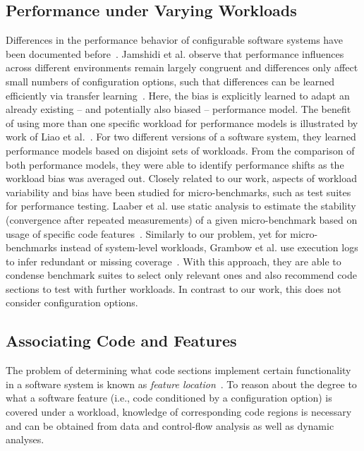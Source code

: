 \subsection{Performance under Varying Workloads}
Differences in the performance behavior of configurable software systems have been documented before~\cite{jamishidi_transfer_2017,alves_sampling_2020}. Jamshidi et al. observe that performance influences across different environments remain largely congruent and differences only affect small numbers of configuration options, such that differences can be learned efficiently via transfer learning~\cite{jamishidi_transfer_2017,jamshidi_learning_2018,jamshidi_transfer_gp_2017,ding_bayesian_2020}. Here, the bias is explicitly learned to adapt an already existing – and potentially also biased -- performance model. The benefit of using more than one specific workload for performance models is illustrated by work of Liao et al.~\cite{liao_2020_using_emse}. For two different versions of a software system, they learned performance models based on disjoint sets of workloads. From the comparison of both performance models, they were able to identify performance shifts as the workload bias was averaged out.
Closely related to our work, aspects of workload variability and bias have been studied for micro-benchmarks, such as test suites for performance testing. Laaber et al. use static analysis to estimate the stability (convergence after repeated measurements) of a given micro-benchmark based on usage of specific code features~\cite{laaber_emse_2021}. Similarly to our problem, yet for micro-benchmarks instead of system-level workloads, Grambow et al. use execution logs to infer redundant or missing coverage~\cite{grambow_peerj_2021}. With this approach, they are able to condense benchmark suites to select only relevant ones and also recommend code sections to test with further workloads. In contrast to our work, this does not consider configuration options.

\subsection{Associating Code and Features}\label{sec:feature_location}
The problem of determining what code sections implement certain functionality in a software system is known as \emph{feature location}~\cite{rubin_feature_2013}. To reason about the degree to what a software feature (i.e., code conditioned by a configuration option) is covered under a workload, knowledge of corresponding code regions is necessary and can be obtained from data and control-flow analysis as well as dynamic analyses.

